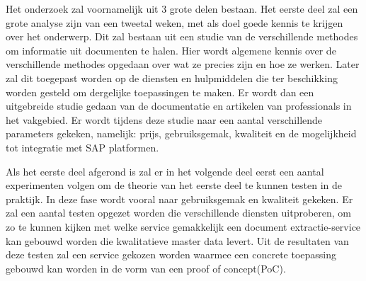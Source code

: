 %
%
%
%
%

Het onderzoek zal voornamelijk uit 3 grote delen bestaan.
Het eerste deel zal een grote analyse zijn van een tweetal weken, met als doel goede kennis te krijgen over het onderwerp. Dit zal bestaan uit een studie van de verschillende methodes om informatie uit documenten te halen. Hier wordt algemene kennis over de verschillende methodes opgedaan over wat ze precies zijn en hoe ze werken. Later zal dit toegepast worden op de diensten en hulpmiddelen die ter beschikking worden gesteld om dergelijke toepassingen te maken. Er wordt dan een uitgebreide studie gedaan van de documentatie en artikelen van professionals in het vakgebied. Er wordt tijdens deze studie naar een aantal verschillende parameters gekeken, namelijk: prijs, gebruiksgemak, kwaliteit en de mogelijkheid tot integratie met SAP platformen.

Als het eerste deel afgerond is zal er in het volgende deel eerst een aantal experimenten volgen om de theorie van het eerste deel te kunnen testen in de praktijk. In deze fase wordt vooral naar gebruiksgemak en kwaliteit gekeken. Er zal een aantal testen opgezet worden die verschillende diensten uitproberen, om zo te kunnen kijken met welke service gemakkelijk een document extractie-service kan gebouwd worden die kwalitatieve master data levert. Uit de resultaten van deze testen zal een service gekozen worden waarmee een concrete toepassing gebouwd kan worden in de vorm van een proof of concept(PoC). 

